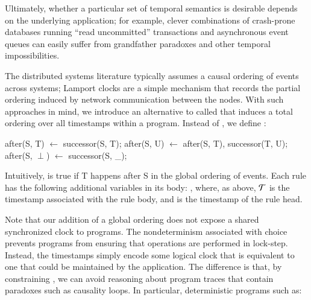 Ultimately, whether a particular set of temporal semantics is
desirable depends on the underlying application; for example, clever
combinations of crash-prone databases running ``read uncommitted''
transactions and asynchronous event queues can easily suffer from
grandfather paradoxes and other temporal impossibilities.  


The distributed systems literature typically assumes a causal ordering
of events across systems; Lamport clocks are a simple mechanism that
records the partial ordering induced by network communication between
the nodes.  With such approaches in mind, we introduce an alternative
to  called  that induces a total
ordering over all timestamps within a \lang program.  Instead of , we define :

\begin{Dedalus}
after(S, T) \(\leftarrow\) successor(S, T);
after(S, U) \(\leftarrow\) after(S, T), successor(T, U);
after(S, \(\perp\)) \(\leftarrow\) successor(S, _);
\end{Dedalus}

Intuitively,  is true if T happens after S in the
global ordering of events.  Each  rule has the
following additional variables in its body:
, where, as
above, $\Tau$ is the timestamp associated with the rule body, and
 is the timestamp of the rule head.

Note that our addition of a global ordering does not expose a shared
synchronized clock to \lang programs.  The nondeterminism associated
with choice prevents programs from ensuring that operations are
performed in lock-step.  Instead, the timestamps simply encode some
logical clock that is equivalent to one that could be maintained by
the application.  The difference is that, by constraining
, we can avoid reasoning about program traces that
contain paradoxes such as causality loops.  In particular, deterministic programs such as:

